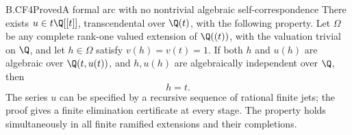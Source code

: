 \begin{claim}{B.CF4}{Proved}{A formal arc with no nontrivial algebraic self-correspondence}
There exists \(u\in t\Q[[t]]\), transcendental over \(\Q(t)\), with
the following property. Let \(\Omega\) be any complete rank-one valued extension
of \(\Q((t))\), with the valuation trivial on \(\Q\), and let
\(h\in\Omega\) satisfy \(v(h)=v(t)=1\). If both \(h\) and
\(u(h)\) are algebraic over \(\Q(t,u(t))\), and \(h,u(h)\) are
algebraically independent over \(\Q\), then
\[
                         h=t.                            \tag{B.CF.3}
\]
The series \(u\) can be specified by a recursive sequence of rational
finite jets; the proof gives a finite elimination certificate at every
stage. The property holds simultaneously in all finite ramified
extensions and their completions.
\end{claim}
